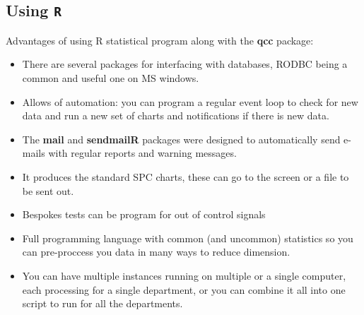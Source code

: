 \documentclass[]{report}
\begin{document}
			\subsection{Using \texttt{R}}
			{
				\large
				Advantages of using R statistical program along with the \textbf{qcc} package:
				\begin{itemize}
					\item There are several packages for interfacing with databases, RODBC being a common and useful one on MS windows.
					\item Allows of automation: you can program a regular event loop to check for new data and run a new set of charts and notifications if there is new data.
					\item The \textbf{mail} and \textbf{sendmailR} packages were designed to automatically send e-mails with regular reports and warning messages.
					\item It produces the standard SPC charts, these can go to the screen or a file to be sent out.
					\item Bespokes tests can be program for out of control signals
					\item Full programming language with common (and uncommon) statistics so you can pre-proccess you data in many ways to reduce dimension.
					\item You can have multiple instances running on multiple or a single computer, each processing for a single department, or you can combine it all into one script to run for all the departments.
				\end{itemize}
			}
\end{document}
